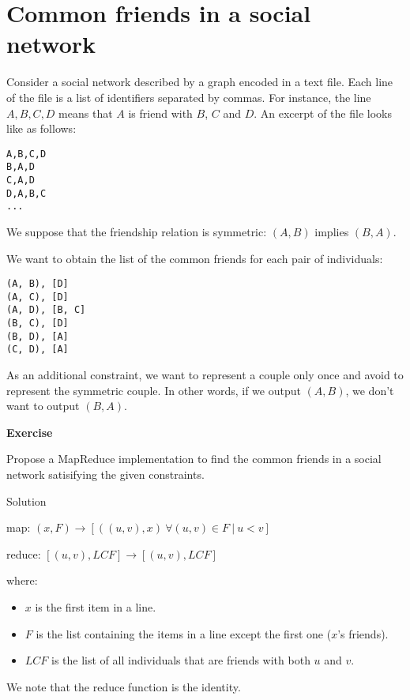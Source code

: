 \documentclass[
]{article}
\providecommand{\tightlist}{%
  \setlength{\itemsep}{0pt}\setlength{\parskip}{0pt}}
\newenvironment{infobox}[1]
  {
  \begin{itemize}
  \renewcommand{\labelitemi}{
    \raisebox{-.7\height}[0pt][0pt]{
      
    }
  }
  \setlength{\fboxsep}{1em}
  \begin{whitebox}
  \item
  }
  {
  \end{whitebox}
  \end{itemize}
  }
\theoremstyle{definition}
\theoremstyle{definition}
\theoremstyle{definition}
\theoremstyle{remark}
\let\BeginKnitrBlock\begin \let\EndKnitrBlock\end
\begin{document}
\hypertarget{common-friends-in-a-social-network}{%
\section{Common friends in a social network}\label{common-friends-in-a-social-network}}

Consider a social network described by a graph encoded in a text file.
Each line of the file is a list of identifiers separated by commas.
For instance, the line \(A,B,C,D\) means that \(A\) is friend with \(B\), \(C\) and \(D\).
An excerpt of the file looks like as follows:

\begin{verbatim}
A,B,C,D
B,A,D
C,A,D
D,A,B,C
...
\end{verbatim}

We suppose that the friendship relation is symmetric: \((A, B)\) implies
\((B, A)\).

We want to obtain the list of the common friends for each pair of individuals:

\begin{verbatim}
(A, B), [D]
(A, C), [D] 
(A, D), [B, C] 
(B, C), [D] 
(B, D), [A] 
(C, D), [A]
\end{verbatim}

As an additional constraint, we want to represent a couple only once and avoid
to represent the symmetric couple.
In other words, if we output \((A, B)\), we don't want to output \((B, A)\).

\begin{infobox}{exercisebox}

\textbf{Exercise}

\BeginKnitrBlock{exercise}
\protect\hypertarget{exr:unnamed-chunk-7}{}{\label{exr:unnamed-chunk-7} }
Propose a MapReduce implementation to find the common friends in a
social network satisifying the given constraints.
\EndKnitrBlock{exercise}

\end{infobox}

Solution

\begin{infobox}{exercisebox}

map: \((x, F) \rightarrow [((u, v), x)\ \forall (u, v) \in F\ |\ u < v ]\)

reduce: \([(u, v), LCF] \rightarrow [(u, v), LCF]\)

where:

\begin{itemize}
\tightlist
\item
  \(x\) is the first item in a line.
\item
  \(F\) is the list containing the items in a line except the first one (\(x\)'s friends).
\item
  \(LCF\) is the list of all individuals that are friends with both \(u\) and \(v\).
\end{itemize}

We note that the reduce function is the identity.

\end{infobox}
\end{document}
